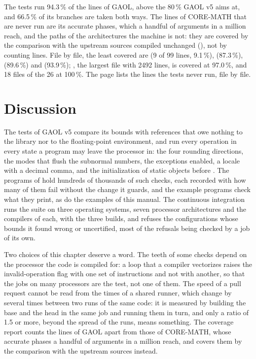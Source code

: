 \documentclass[12pt,a4paper,twoside,openright]{book}
\begin{document}
\noindent
The tests run 94.3\,\% of the lines of GAOL, above the 80\,\% GAOL v5 aims
at, and 66.5\,\% of its branches are taken both ways. The lines of CORE-MATH
that are never run are its accurate phases, which a handful of arguments in
a million reach, and the paths of the architectures the machine is not: they
are covered by the comparison with the upstream sources compiled unchanged
(), not by counting lines. File by file, the least
covered are  (9 of 99 lines, 9.1\,\%),
 (87.3\,\%),
 (89.6\,\%) and
 (93.9\,\%);
, the largest file with 2492 lines,
is covered at 97.0\,\%, and 18 files of the 26 at 100\,\%. The page lists
the lines the tests never run, file by file.

\section{Discussion}

The tests of GAOL v5 compare its bounds with references that owe nothing to
the library nor to the floating-point environment, and run every operation
in every state a program may leave the processor in: the four rounding
directions, the modes that flush the subnormal numbers, the exceptions
enabled, a locale with a decimal comma, and the initialization of static
objects before . The programs of  hold hundreds
of thousands of such checks, each recorded with how many of them fail
without the change it guards, and the example programs check what they
print, as do the examples of this manual. The continuous integration runs
the suite on three operating systems, seven processor architectures and the
compilers of each, with the three builds, and refuses the configurations
whose bounds it found wrong or uncertified, most of the refusals being checked by a
job of its own.

\medskip
Two choices of this chapter deserve a word. The teeth of some checks depend
on the processor the code is compiled for: a loop that a compiler
vectorizes raises the invalid-operation flag with one set of instructions
and not with another, so that the jobs on many processors are the test, not
one of them. The speed of a pull request cannot be read from the times of a
shared runner, which change by several times between two runs of the same
code: it is measured by building the base and the head in the same job and
running them in turn, and only a ratio of 1.5 or more, beyond the spread of
the runs, means something. The coverage report counts the lines of GAOL
apart from those of CORE-MATH, whose accurate phases a handful of arguments
in a million reach, and covers them by the comparison with the upstream
sources instead.
\end{document}
